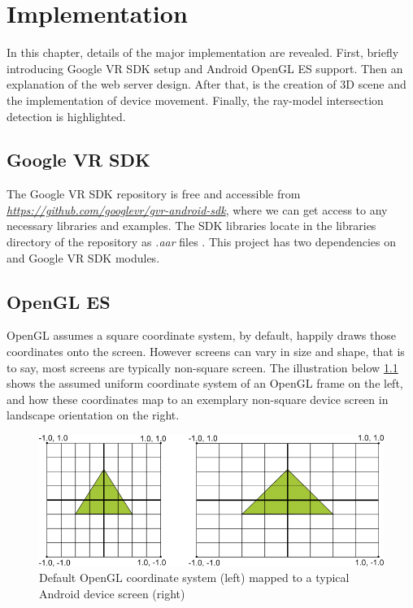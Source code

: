\chapter{Implementation}
\label{chapter-implementation}

In this chapter, details of the major implementation are revealed. First, briefly introducing Google VR SDK setup and Android OpenGL ES support. Then an explanation of the web server design. After that, is the creation of 3D scene and the implementation of device movement. Finally, the ray-model intersection detection is highlighted.

\section{Google VR SDK}

The Google VR SDK repository is free and accessible from \href{https://github.com/googlevr/gvr-android-sdk}{\emph{https://github.com/googlevr/gvr-android-sdk}}, where we can get access to any necessary libraries and examples. The SDK libraries locate in the libraries directory of the repository as \emph{.aar} files \cite{google.aar-format.2016}. This project has two dependencies on  and  Google VR SDK modules.

\section{OpenGL ES}

OpenGL assumes a square coordinate system, by default, happily draws those coordinates onto the screen. However screens can vary in size and shape, that is to say, most screens are typically non-square screen. The illustration below \ref{fig:opengl-coordinates} shows the assumed uniform coordinate system of an OpenGL frame on the left, and how these coordinates map to an exemplary non-square device screen in landscape orientation on the right.

\begin{figure}[H]
\caption[OpenGL coordinate system mapping]{Default OpenGL coordinate system (left) mapped to a typical Android device screen (right) \cite{google.opengles.2016}}
\label{fig:opengl-coordinates}
\centering
\includegraphics[width=\textwidth, keepaspectratio]{Figures/opengl-coordinates.png}
\decoRule
\end{figure}

